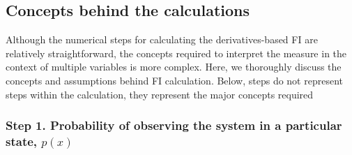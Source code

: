 \documentclass[12pt,twoside]{reedthesis}
\begin{document}
\subsection{Concepts behind the
calculations}\label{concepts-behind-the-calculations}

Although the numerical steps for calculating the derivatives-based FI
are relatively straightforward, the concepts required to interpret the
measure in the context of multiple variables is more complex. Here, we
thoroughly discuss the concepts and assumptions behind FI calculation.
Below, steps do not represent steps within the calculation, they
represent the major concepts required

\subsubsection{\texorpdfstring{\textbf{Step 1. Probability of observing
the system in a particular state,
\(p(x)\)}}{Step 1. Probability of observing the system in a particular state, p(x)}}\label{step-1.-probability-of-observing-the-system-in-a-particular-state-px}
\end{document}
